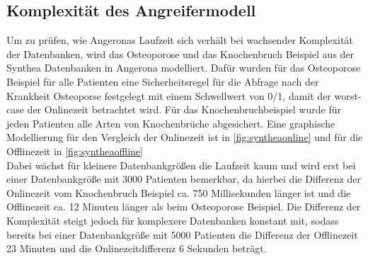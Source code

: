 \documentclass[german,version-2020-11]{uzl-thesis}
\begin{document}
\subsection{Komplexität des Angreifermodell}
Um zu prüfen, wie Angeronas Laufzeit sich verhält bei wachsender Komplexität der Datenbanken, wird das Osteoporose und das Knochenbruch Beispiel aus der Synthea Datenbanken in Angerona modelliert. Dafür wurden für das Osteoporose Beispiel für alle Patienten eine Sicherheitsregel für die Abfrage nach der Krankheit Osteoporse festgelegt mit einem Schwellwert von 0/1, damit der worst-case der Onlinezeit betrachtet wird. Für das Knochenbruchbeispiel wurde für jeden Patienten alle Arten von Knochenbrüche abgesichert. Eine graphische Modellierung für den Vergleich der Onlinezeit ist in \autoref{fig:syntheaonline} und für die Offlinezeit in \autoref{fig:syntheaoffline}\\  Dabei wächst für kleinere Datenbankgrößen die Laufzeit kaum und wird erst bei einer Datenbankgröße mit 3000 Patienten bemerkbar, da hierbei die Differenz der Onlinezeit vom Knochenbruch Beispiel ca. 750 Millisekunden länger ist und die Offlinezeit ca. 12 Minuten länger als beim Osteoporose Beispiel. Die Differenz der Komplexität steigt jedoch für komplexere Datenbanken konstant mit, sodass bereits bei einer Datenbankgröße mit 5000 Patienten die Differenz der Offlinezeit 23 Minuten und die Onlinezeitdifferenz 6 Sekunden beträgt.
\end{document}

